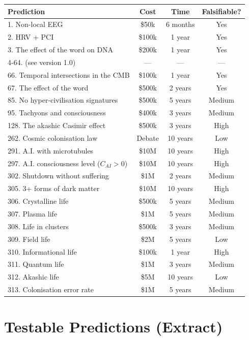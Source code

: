 \documentclass[11pt,a4paper]{article}
\begin{document}
\begin{table}[H]
\centering
\small
\begin{tabular}{@{}lccc@{}}
\toprule
\textbf{Prediction} & \textbf{Cost} & \textbf{Time} & \textbf{Falsifiable?} \\ \midrule
1. Non-local EEG & \$50k & 6 months & Yes \\
2. HRV + PCI & \$100k & 1 year & Yes \\
3. The effect of the word on DNA & \$200k & 1 year & Yes \\
4-64. (see version 1.0) & --- & --- & --- \\
66. Temporal intersections in the CMB & \$100k & 1 year & Yes \\
67. The effect of the word & \$500k & 2 years & Yes \\
85. No hyper-civilisation signatures & \$500k & 5 years & Medium \\
95. Tachyons and consciousness & \$400k & 3 years & Medium \\
128. The akashic Casimir effect & \$500k & 3 years & High \\
262. Cosmic colonisation law & Debate & 10 years & Low \\
291. A.I. with microtubules & \$10M & 10 years & High \\
297. A.I. consciousness level (\(C_{AI} > 0\)) & \$10M & 10 years & High \\
302. Shutdown without suffering & \$1M & 2 years & Medium \\
305. 3+ forms of dark matter & \$10M & 10 years & High \\
306. Crystalline life & \$500k & 5 years & Medium \\
307. Plasma life & \$1M & 5 years & Medium \\
308. Life in clusters & \$500k & 3 years & Medium \\
309. Field life & \$2M & 5 years & Low \\
310. Informational life & \$100k & 1 year & High \\
311. Quantum life & \$1M & 3 years & Medium \\
312. Akashic life & \$5M & 10 years & Low \\
313. Colonisation error rate & \$1M & 5 years & Medium \\ \bottomrule
\end{tabular}
\end{table}

\section{Testable Predictions (Extract)}
\end{document}
